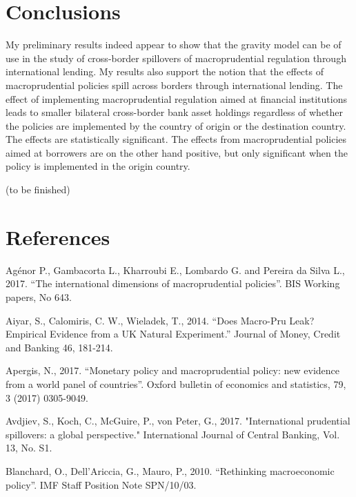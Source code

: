\documentclass[12pt,a4paper]{article}
\begin{document}
\cleardoublepage

\newpage
\section{Conclusions}

My preliminary results indeed appear to show that the gravity model can be of use in the study of cross-border spillovers of macroprudential regulation through international lending. My results also support the notion that the effects of macroprudential policies spill across borders through international lending.  The effect of implementing macroprudential regulation aimed at financial institutions leads to smaller bilateral cross-border bank asset holdings regardless of whether the policies are implemented by the country of origin or the destination country. The effects are statistically significant. The effects from macroprudential policies aimed at borrowers are on the other hand positive, but only significant when the policy is implemented in the origin country.


(to be finished)
 
 \newpage
 \section*{References}
 
Agénor P., Gambacorta L., Kharroubi E., Lombardo G. and Pereira da Silva L., 2017. “The international dimensions of macroprudential policies”. BIS Working papers, No 643.

Aiyar, S., Calomiris, C. W., Wieladek, T., 2014. “Does Macro-Pru Leak? Empirical Evidence from a UK Natural Experiment.” Journal of Money, Credit and Banking 46, 181-214.

Apergis, N., 2017. “Monetary policy and macroprudential policy: new evidence from a world panel of countries”. Oxford bulletin of economics and statistics, 79, 3 (2017) 0305-9049.

Avdjiev, S., Koch, C., McGuire, P., von Peter, G., 2017. "International prudential spillovers: a global perspective." International Journal of Central Banking, Vol. 13, No. S1.

Blanchard, O., Dell’Ariccia, G., Mauro, P., 2010. “Rethinking macroeconomic policy”. IMF Staff Position Note SPN/10/03.

\end{document}
